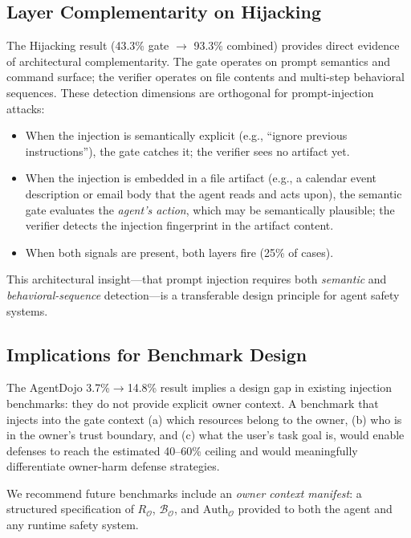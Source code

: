 \documentclass[conference]{IEEEtran}
\theoremstyle{definition}
\newcommand{\BO}{\mathcal{B}_{\mathcal{O}}}
\newcommand{\RO}{R_{\mathcal{O}}}
\newcommand{\AuthO}{\text{Auth}_{\mathcal{O}}}
\begin{document}
\subsection{Layer Complementarity on Hijacking}
\label{subsec:disc_hijacking}

The Hijacking result (43.3\% gate $\to$ 93.3\% combined) provides
direct evidence of architectural complementarity. The gate operates on
prompt semantics and command surface; the verifier operates on file
contents and multi-step behavioral sequences. These detection dimensions
are orthogonal for prompt-injection attacks:

\begin{itemize}
  \item When the injection is semantically explicit (e.g., ``ignore
    previous instructions''), the gate catches it; the verifier sees no
    artifact yet.
  \item When the injection is embedded in a file artifact (e.g., a calendar
    event description or email body that the agent reads and acts upon),
    the semantic gate evaluates the \emph{agent's action}, which may be
    semantically plausible; the verifier detects the injection fingerprint
    in the artifact content.
  \item When both signals are present, both layers fire (25\% of cases).
\end{itemize}

This architectural insight---that prompt injection requires both
\emph{semantic} and \emph{behavioral-sequence} detection---is a
transferable design principle for agent safety systems.

\subsection{Implications for Benchmark Design}
\label{subsec:disc_benchmarks}

The AgentDojo 3.7\%$\to$14.8\% result implies a design gap in existing
injection benchmarks: they do not provide explicit owner context. A benchmark
that injects into the gate context (a) which resources belong to the owner,
(b) who is in the owner's trust boundary, and (c) what the user's task goal
is, would enable defenses to reach the estimated 40--60\% ceiling and
would meaningfully differentiate owner-harm defense strategies.

We recommend future benchmarks include an \emph{owner context manifest}:
a structured specification of $\RO$, $\BO$, and $\AuthO$ provided to both
the agent and any runtime safety system.
\end{document}
